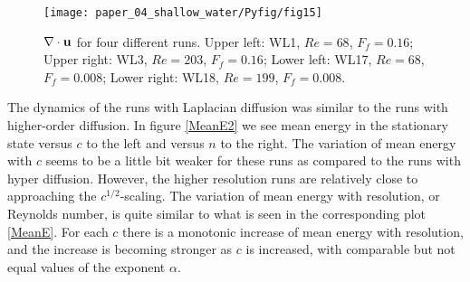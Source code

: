 \begin{figure}
\centerline{\texttt{[image: paper\_04\_shallow\_water/Pyfig/fig15]}}
\caption{$ \nabla \cdot {\bf u} $ for four different runs. Upper left: WL1, $ Re = 68 $, $ F_f = 0.16 $; Upper right:  { WL3,  $ Re = 203 $, $ F_f = 0.16 $;} Lower left: WL17, $ Re = 68 $, $ F_f = 0.008 $; Lower right: WL18,  $ Re = 199 $, $ F_f = 0.008 $.}
\label{Physical_lap}
\end{figure}




The dynamics of the runs with Laplacian diffusion was similar to the runs with higher-order diffusion. In figure \ref{MeanE2} we see mean energy in the stationary state versus $ c $ to the left and versus $ n $ to the right.
The variation of mean energy with $ c $ seems to be a little bit weaker for these runs as compared to the runs with hyper diffusion.  { However, the higher resolution runs are relatively close to approaching the $ c^{1/2} $-scaling.}
The variation of mean energy with resolution, or Reynolds number, is quite similar to what is seen in the corresponding plot \ref{MeanE}. For each $ c $ there is a monotonic increase of mean energy with resolution, and the increase is becoming stronger as $ c $ is increased, with comparable but not equal values of the exponent $ \alpha $.


